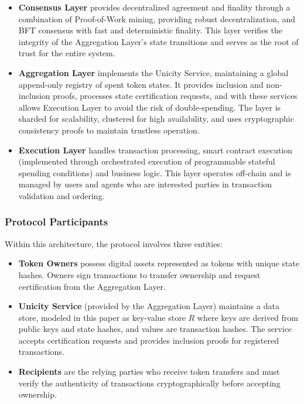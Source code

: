 \documentclass{article}
\begin{document}
\begin{itemize}
\item \textbf{Consensus Layer} provides decentralized agreement and finality through a combination of Proof-of-Work mining, providing robust decentralization, and BFT consensus with fast and deterministic finality. This layer verifies the integrity of the Aggregation Layer's state transitions and serves as the root of trust for the entire system.

\item \textbf{Aggregation Layer} implements the Unicity Service, maintaining a global append-only registry of spent token states. It provides inclusion and non-inclusion proofs, processes state certification requests, and with these services allows Execution Layer to avoid the risk of double-spending. The layer is sharded for scalability, clustered for high availability, and uses cryptographic consistency proofs to maintain trustless operation.

\item \textbf{Execution Layer} handles transaction processing, smart contract execution (implemented through orchestrated execution of programmable stateful spending conditions) and business logic. This layer operates off-chain and is managed by users and agents who are interested parties in transaction validation and ordering.
\end{itemize}

\subsubsection{Protocol Participants}

Within this architecture, the protocol involves three entities:

\begin{itemize}
\item \textbf{Token Owners} possess digital assets represented as tokens with unique state hashes. Owners sign transactions to transfer ownership and request certification from the Aggregation Layer.

\item \textbf{Unicity Service} (provided by the Aggregation Layer) maintains a data store, modeled in this paper as key-value store $R$ where keys are derived from public keys and state hashes, and values are transaction hashes. The service accepts certification requests and provides inclusion proofs for registered transactions.

\item \textbf{Recipients} are the relying parties who receive token transfers and must verify the authenticity of transactions cryptographically before accepting ownership.
\end{itemize}
\end{document}
